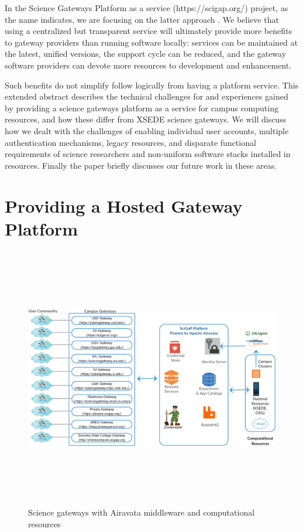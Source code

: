 \documentclass[sigconf]{acmart}
\begin{document}
In the Science Gateways Platform as a service (https://scigap.org/) project, as the name indicates, we are focusing on the latter approach \cite{pierce2015patching}. We believe that using a centralized but transparent service will ultimately provide more benefits to gateway providers than running software locally: services can be maintained at the latest, unified versions, the support cycle can be reduced, and the gateway software providers can devote more resources to development and enhancement. 

Such benefits do not simplify follow logically from having a platform service. This extended abstract describes the technical challenges for and experiences gained by providing a science gateways platform as a service for campus computing resources, and how these differ from XSEDE science gateways. We will discuss how we dealt with the challenges of enabling individual user accounts, multiple authentication mechanisms, legacy resources, and disparate functional requirements of science researchers and non-uniform software stacks installed in resources. Finally the paper briefly discusses our future work in these areas.

\section{Providing a Hosted Gateway Platform}
\begin{figure}
\includegraphics[height=4.5in, width=7in]{figures/gateway_deployments.pdf}
\caption{Science gateways with Airavata middleware and computational resources}
\end{figure}
\end{document}
